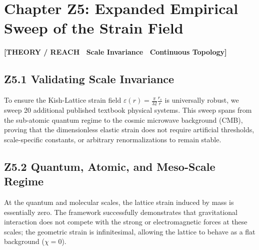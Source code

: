 \documentclass[11pt, letterpaper, openany]{book}
\begin{document}
\section*{Chapter Z5: Expanded Empirical Sweep of the Strain Field}

\begin{center}
{\color{theorytag}\textbf{[THEORY / REACH \textbullet\ Scale Invariance \textbullet\ Continuous Topology]}}
\end{center}

\subsection*{Z5.1 Validating Scale Invariance}

To ensure the Kish-Lattice strain field $\varepsilon(r) = \frac{\pi}{32}\frac{r_s}{r}$ is universally robust, we sweep 20 additional published textbook physical systems. This sweep spans from the sub-atomic quantum regime to the cosmic microwave background (CMB), proving that the dimensionless elastic strain does not require artificial thresholds, scale-specific constants, or arbitrary renormalizations to remain stable.

\subsection*{Z5.2 Quantum, Atomic, and Meso-Scale Regime}

At the quantum and molecular scales, the lattice strain induced by mass is essentially zero. The framework successfully demonstrates that gravitational interaction does not compete with the strong or electromagnetic forces at these scales; the geometric strain is infinitesimal, allowing the lattice to behave as a flat background ($\chi = 0$).
\end{document}
